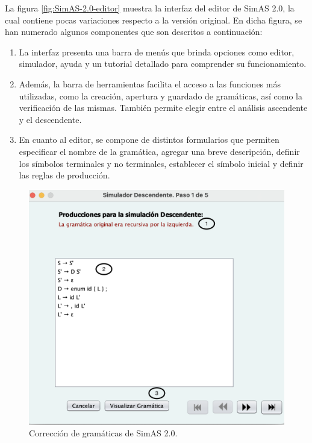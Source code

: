 La figura \ref{fig:SimAS-2.0-editor} muestra la interfaz del editor de SimAS 2.0, la cual contiene pocas variaciones respecto a la versión original. En dicha figura, se han numerado algunos componentes que son descritos a continuación:
 \begin{enumerate}
     \item La interfaz presenta una barra de menús que brinda opciones como editor, simulador, ayuda y un tutorial detallado para comprender su funcionamiento.
     \item Además, la barra de herramientas facilita el acceso a las funciones más utilizadas, como la creación, apertura y guardado de gramáticas, así como la verificación de las mismas. También permite elegir entre el análisis ascendente y el descendente.
     \item En cuanto al editor, se compone de distintos formularios que permiten especificar el nombre de la gramática, agregar una breve descripción, definir los símbolos terminales y no terminales, establecer el símbolo inicial y definir las reglas de producción.
 \end{enumerate}

\begin{figure}[p]
 	\begin{center}
      \includegraphics[scale=0.5]{figuras/Cap3/SimAS2/paso1.png} 
       \caption{Corrección de gramáticas de SimAS 2.0.}\label{fig:SimAS-2.0-paso1}
 	\end{center}
\end{figure}


